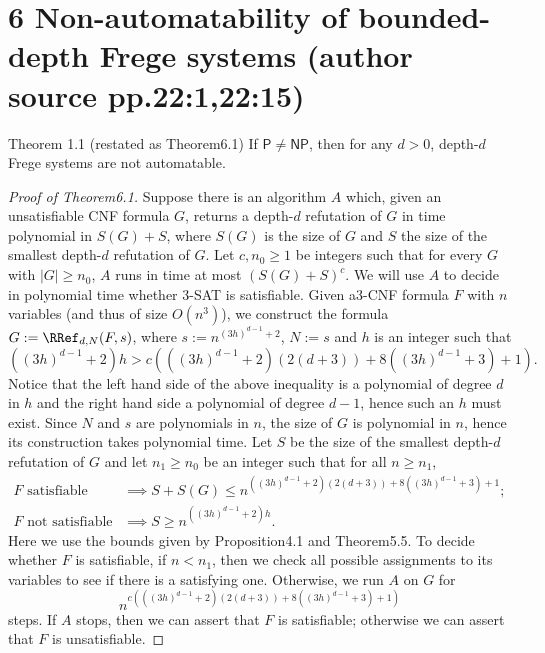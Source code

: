 \section*{6 Non-automatability of bounded-depth Frege systems (author source pp.22:1,22:15)}
\begin{originalresult}{Theorem 1.1 (restated as Theorem6.1)}
If $\mathsf P\ne\mathsf{NP}$, then for any $d>0$, depth-$d$ Frege systems are not automatable.
\end{originalresult}
\begin{proof}[Proof of Theorem6.1]
Suppose there is an algorithm $A$ which, given an unsatisfiable CNF formula $G$, returns a depth-$d$ refutation of $G$ in time polynomial in $S(G)+S$, where $S(G)$ is the size of $G$ and $S$ the size of the smallest depth-$d$ refutation of $G$. Let $c,n_0\ge1$ be integers such that for every $G$ with $|G|\ge n_0$, $A$ runs in time at most $(S(G)+S)^c$. We will use $A$ to decide in polynomial time whether 3-SAT is satisfiable. Given a3-CNF formula $F$ with $n$ variables (and thus of size $O(n^3)$), we construct the formula $G:=\RRef_{d,N}(F,s)$, where $s:=n^{(3h)^{d-1}+2}$, $N:=s$ and $h$ is an integer such that
\[((3h)^{d-1}+2)h>c\left(((3h)^{d-1}+2)(2(d+3))+8((3h)^{d-1}+3)+1\right).\]
Notice that the left hand side of the above inequality is a polynomial of degree $d$ in $h$ and the right hand side a polynomial of degree $d-1$, hence such an $h$ must exist. Since $N$ and $s$ are polynomials in $n$, the size of $G$ is polynomial in $n$, hence its construction takes polynomial time. Let $S$ be the size of the smallest depth-$d$ refutation of $G$ and let $n_1\ge n_0$ be an integer such that for all $n\ge n_1$,
\begin{align*}
F\text{ satisfiable}&\implies S+S(G)\le n^{((3h)^{d-1}+2)(2(d+3))+8((3h)^{d-1}+3)+1};\\
F\text{ not satisfiable}&\implies S\ge n^{((3h)^{d-1}+2)h}.
\end{align*}
Here we use the bounds given by Proposition4.1 and Theorem5.5. To decide whether $F$ is satisfiable, if $n<n_1$, then we check all possible assignments to its variables to see if there is a satisfying one. Otherwise, we run $A$ on $G$ for
\[n^{c(((3h)^{d-1}+2)(2(d+3))+8((3h)^{d-1}+3)+1)}\]
steps. If $A$ stops, then we can assert that $F$ is satisfiable; otherwise we can assert that $F$ is unsatisfiable.
\end{proof}
